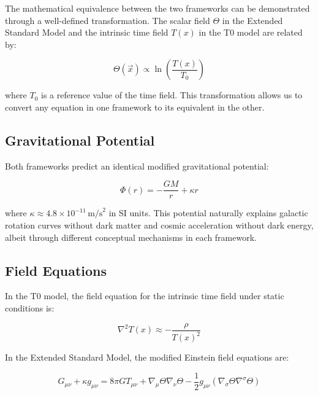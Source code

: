 \documentclass[12pt,a4paper]{article}
\newcommand{\Tfield}{T(x)}
\newcommand{\Tzero}{T_0}
\newcommand{\vecx}{\vec{x}}
\begin{document}
	The mathematical equivalence between the two frameworks can be demonstrated through a well-defined transformation. The scalar field \(\Theta\) in the Extended Standard Model and the intrinsic time field \(\Tfield\) in the T0 model are related by:
	
	\begin{equation}
		\Theta(\vecx) \propto \ln\left(\frac{\Tfield}{\Tzero}\right)
	\end{equation}
	
	where \(\Tzero\) is a reference value of the time field. This transformation allows us to convert any equation in one framework to its equivalent in the other.
	
	\subsection{Gravitational Potential}
	\label{subsec:gravitational_potential}
	
	Both frameworks predict an identical modified gravitational potential:
	
	\begin{equation}
		\Phi(r) = -\frac{GM}{r} + \kappa r
	\end{equation}
	
	where \(\kappa \approx 4.8 \times 10^{-11} \, \text{m/s}^2\) in SI units. This potential naturally explains galactic rotation curves without dark matter and cosmic acceleration without dark energy, albeit through different conceptual mechanisms in each framework.
	
	\subsection{Field Equations}
	\label{subsec:field_equations}
	
	In the T0 model, the field equation for the intrinsic time field under static conditions is:
	
	\begin{equation}
		\nabla^2\Tfield \approx -\frac{\rho}{\Tfield^2}
	\end{equation}
	
	In the Extended Standard Model, the modified Einstein field equations are:
	
	\begin{equation}
		G_{\mu\nu} + \kappa g_{\mu\nu} = 8\pi G T_{\mu\nu} + \nabla_{\mu}\Theta\nabla_{\nu}\Theta - \frac{1}{2}g_{\mu\nu}(\nabla_{\sigma}\Theta\nabla^{\sigma}\Theta)
	\end{equation}
	
\end{document}
